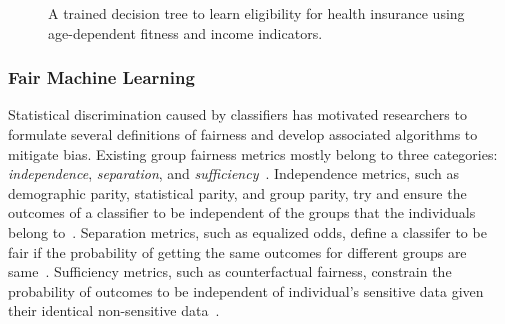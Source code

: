 \begin{figure}[t!]
\begin{minipage}{.33\columnwidth}
	\end{minipage}\hspace*{-2em}
	\begin{minipage}{.35\columnwidth}
	\end{minipage}%
	\caption{A trained decision tree to learn eligibility for health insurance using age-dependent fitness and income indicators.}\label{fairness_justicia_fig:fair_example}%
\end{figure}


\subsubsection{Fair Machine Learning} Statistical discrimination caused by classifiers has motivated researchers to formulate several definitions of fairness and develop associated algorithms to mitigate bias.   Existing group fairness metrics mostly belong to three categories: \textit{independence}, \textit{separation}, and \textit{sufficiency}~\cite{mehrabi2019survey}. Independence metrics, such as demographic parity, statistical parity, and group parity, try and ensure the outcomes of a classifier to be independent of the groups that the individuals belong to~\cite{feldman2015certifying,dwork2012fairness}. Separation metrics, such as equalized odds, define a classifer to be fair if the probability of getting the same outcomes for different groups are same~\cite{hardt2016equality}. Sufficiency metrics, such as counterfactual fairness, constrain the probability of outcomes to be independent of individual's sensitive data given their identical non-sensitive data~\cite{kusner2017counterfactual}.

